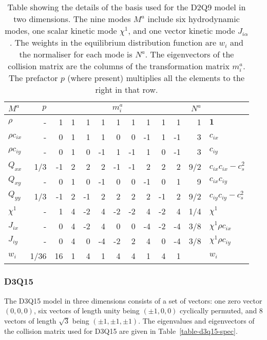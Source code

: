 \begin{table}[t]
\begin{center}
\begin{tabular}{|l|r|rrrrrrrrr|r|l|}
\hline\hline
$M^a$ & $p$ & \multicolumn{9}{c|}{$m_i^a$} & $N^a$  &\\
\hline
$\rho$ & - & 1 &  1 &  1 &  1 &  1 &  1 &  1 &   1 &  1 & 1 &$\mathbf{1}$ \\
\hline
$\rho c_{ix}$ & - & 0 &  1 &  1 & 1 & 0 &  0 & -1 &  1 & -1 & 3 & $c_{ix}$ \\
\hline
$\rho c_{iy}$ & - & 0 & 1 &  0 &  -1 &  1 &  -1 & 1 & 0 & -1 & 3  &$c_{iy}$ \\
\hline
$Q_{xx}$ & 1/3 & -1 &  2 &  2 & 2 & -1 & -1 & 2 & 2 & 2 & 9/2 
& $c_{ix} c_{ix} - c_s^2$ \\
\hline
$Q_{xy}$ & - & 0 &  1 & 0 & -1 & 0 & 0 & -1 & 0 & 1 & 9 & $c_{ix} c_{iy}$ \\
\hline
$Q_{yy}$ & 1/3 & -1 &  2 & -1 & 2 & 2 & 2 & 2 & -1 & 2 & 9/2
& $c_{iy} c_{iy} - c_s^2$ \\
\hline\hline
$\chi^1$ & - &  1 & 4 & -2 & 4 & -2 & -2 & 4 & -2 & 4 & 1/4 & $\chi^1$ \\
\hline
$J_{ix}$ & - & 0 &  4 & -2 & 4 & 0 & 0 & -4 & -2 & -4 & 3/8
& $\chi^1 \rho c_{ix}$\\
\hline
$J_{iy}$ & - & 0 & 4 & 0 & -4 & -2 & 2 & 4 & 0 & -4 & 3/8
& $\chi^1 \rho c_{iy}$\\
\hline\hline
$w_i$ & 1/36 & 16 & 1 & 4 & 1 & 4 & 4 & 1 & 4 & 1 & & $w_i$\\
\hline\hline
\end{tabular}
\end{center}
\caption{Table showing the details of the basis used for the D2Q9 model
in two dimensions. The nine modes $M^a$ include six hydrodynamic modes,
one scalar kinetic mode $\chi^1$, and one vector kinetic mode $J_{i\alpha}$.
The weights in the equilibrium distribution function are $w_i$ and the
normaliser for each mode is $N^a$. The eigenvectors of the collision
matrix are the columns of the transformation matrix $m^a_i$. The prefactor
$p$ (where present) multiplies all the elements to the right in that row.}
\label{table-d2q9-spec}
\end{table}



\subsubsection{D3Q15}

The D3Q15 model in three dimensions consists of a set of vectors:
one zero vector $(0,0,0)$, six vectors of length unity being
$(\pm 1, 0, 0)$ cyclically permuted, and 8 vectors of length
$\sqrt{3}$ being $(\pm 1, \pm 1, \pm 1)$.
The eigenvalues and eigenvectors of the collision
matrix used for D3Q15 are given in Table~\ref{table-d3q15-spec}.


